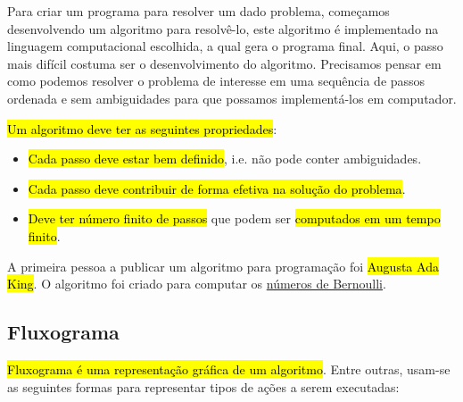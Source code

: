Para criar um programa para resolver um dado problema, começamos desenvolvendo um algoritmo para resolvê-lo, este algoritmo é implementado na linguagem computacional escolhida, a qual gera o programa final. Aqui, o passo mais difícil costuma ser o desenvolvimento do algoritmo. Precisamos pensar em como podemos resolver o problema de interesse em uma sequência de passos ordenada e sem ambiguidades para que possamos implementá-los em computador.

\hl{Um algoritmo deve ter as seguintes propriedades}:
\begin{itemize}
\item \hl{Cada passo deve estar bem definido}, i.e. não pode conter ambiguidades.
\item \hl{Cada passo deve contribuir de forma efetiva na solução do problema}.
\item \hl{Deve ter número finito de passos} que podem ser \hl{computados em um tempo finito}.
\end{itemize}

\begin{obs}
  A primeira pessoa a publicar um algoritmo para programação foi \hl{Augusta Ada King}{\lovelace}. O algoritmo foi criado para computar os \href{https://pt.wikipedia.org/wiki/N\%C3\%BAmeros\_de\_Bernoulli}{números de Bernoulli}{\bernoulli}.
\end{obs}


\subsection{Fluxograma}

\hl{Fluxograma é uma representação gráfica de um algoritmo}. Entre outras, usam-se as seguintes formas para representar tipos de ações a serem executadas:

